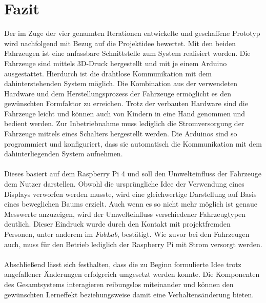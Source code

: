 \documentclass[.../Dokumentation.tex]{subfile}
\begin{document}
    \section{Fazit}\label{sec-result}
   	Der im Zuge der vier genannten Iterationen entwickelte und geschaffene Prototyp wird nachfolgend mit Bezug auf die Projektidee bewertet. Mit den beiden Fahrzeugen ist eine anfassbare Schnittstelle zum System realisiert worden. Die Fahrzeuge sind mittels 3D-Druck hergestellt und mit je einem Arduino ausgestattet. Hierdurch ist die drahtlose Kommunikation mit dem dahinterstehenden System möglich. Die Kombination aus der verwendeten Hardware und dem Herstellungsprozess der Fahrzeuge ermöglicht es den gewünschten Formfaktor zu erreichen. Trotz der verbauten Hardware sind die Fahrzeuge leicht und können auch von Kindern in eine Hand genommen und bedient werden. Zur Inbetriebnahme muss lediglich die Stromversorgung der Fahrzeuge mittels eines Schalters hergestellt werden. Die Arduinos sind so programmiert und konfiguriert, dass sie automatisch die Kommunikation mit dem dahinterliegenden System aufnehmen. \\\\
   	Dieses basiert auf dem Raspberry Pi 4 und soll den Umwelteinfluss der Fahrzeuge dem Nutzer darstellen. Obwohl die ursprüngliche Idee der Verwendung eines Displays verworfen werden musste, wird eine gleichwertige Darstellung auf Basis eines beweglichen Baums erzielt. Auch wenn es so nicht mehr möglich ist genaue Messwerte anzuzeigen, wird der Umwelteinfluss verschiedener Fahrzeugtypen deutlich. Dieser Eindruck wurde durch den Kontakt mit projektfremden Personen, unter anderem im \emph{FabLab}, bestätigt. Wie zuvor bei den Fahrzeugen auch, muss für den Betrieb lediglich der Raspberry Pi mit Strom versorgt werden.\\\\
   	Abschließend lässt sich festhalten, dass die zu Beginn formulierte Idee trotz angefallener Änderungen erfolgreich umgesetzt werden konnte. Die Komponenten des Gesamtsystems interagieren reibungslos miteinander und können den gewünschten Lerneffekt beziehungsweise damit eine Verhaltensänderung bieten.
   	
\end{document}
